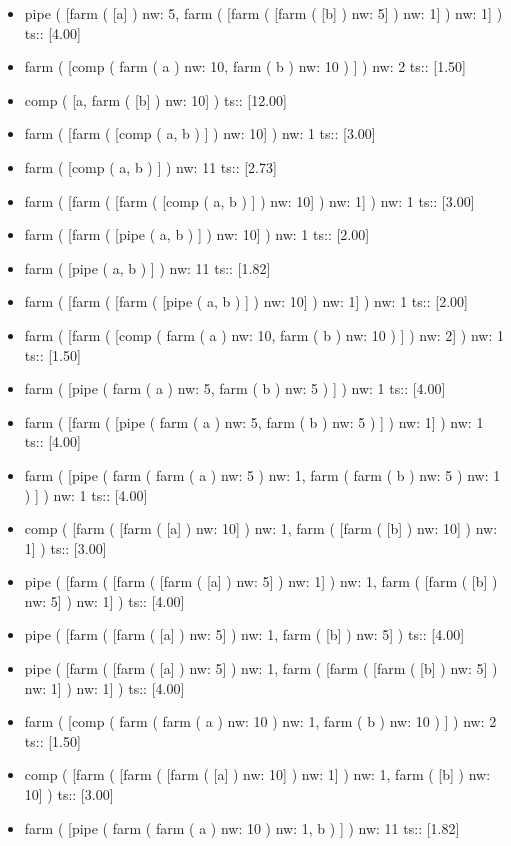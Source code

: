 \documentclass[12pt]{report}
\begin{document}
{\begin{itemize}
\item pipe  ( [farm  ( [a] )  nw: 5, farm  ( [farm  ( [farm  ( [b] )  nw: 5] )  nw: 1] )  nw: 1] )  ts::  [4.00] 
\item farm  ( [comp ( farm  ( a )  nw: 10, farm  ( b )  nw: 10 ) ] )  nw: 2 ts::  [1.50] 
\item comp  ( [a, farm  ( [b] )  nw: 10] )  ts::  [12.00] 
\item farm  ( [farm  ( [comp ( a, b ) ] )  nw: 10] )  nw: 1 ts::  [3.00] 
\item farm  ( [comp ( a, b ) ] )  nw: 11 ts::  [2.73] 
\item farm  ( [farm  ( [farm  ( [comp ( a, b ) ] )  nw: 10] )  nw: 1] )  nw: 1 ts::  [3.00] 
\item farm  ( [farm  ( [pipe ( a, b ) ] )  nw: 10] )  nw: 1 ts::  [2.00] 
\item farm  ( [pipe ( a, b ) ] )  nw: 11 ts::  [1.82] 
\item farm  ( [farm  ( [farm  ( [pipe ( a, b ) ] )  nw: 10] )  nw: 1] )  nw: 1 ts::  [2.00] 
\item farm  ( [farm  ( [comp ( farm  ( a )  nw: 10, farm  ( b )  nw: 10 ) ] )  nw: 2] )  nw: 1 ts::  [1.50] 
\item farm  ( [pipe ( farm  ( a )  nw: 5, farm  ( b )  nw: 5 ) ] )  nw: 1 ts::  [4.00] 
\item farm  ( [farm  ( [pipe ( farm  ( a )  nw: 5, farm  ( b )  nw: 5 ) ] )  nw: 1] )  nw: 1 ts::  [4.00] 
\item farm  ( [pipe ( farm  ( farm  ( a )  nw: 5 )  nw: 1, farm  ( farm  ( b )  nw: 5 )  nw: 1 ) ] )  nw: 1 ts::  [4.00] 
\item comp  ( [farm  ( [farm  ( [a] )  nw: 10] )  nw: 1, farm  ( [farm  ( [b] )  nw: 10] )  nw: 1] )  ts::  [3.00] 
\item pipe  ( [farm  ( [farm  ( [farm  ( [a] )  nw: 5] )  nw: 1] )  nw: 1, farm  ( [farm  ( [b] )  nw: 5] )  nw: 1] )  ts::  [4.00] 
\item pipe  ( [farm  ( [farm  ( [a] )  nw: 5] )  nw: 1, farm  ( [b] )  nw: 5] )  ts::  [4.00] 
\item pipe  ( [farm  ( [farm  ( [a] )  nw: 5] )  nw: 1, farm  ( [farm  ( [farm  ( [b] )  nw: 5] )  nw: 1] )  nw: 1] )  ts::  [4.00] 
\item farm  ( [comp ( farm  ( farm  ( a )  nw: 10 )  nw: 1, farm  ( b )  nw: 10 ) ] )  nw: 2 ts::  [1.50] 
\item comp  ( [farm  ( [farm  ( [farm  ( [a] )  nw: 10] )  nw: 1] )  nw: 1, farm  ( [b] )  nw: 10] )  ts::  [3.00] 
\item farm  ( [pipe ( farm  ( farm  ( a )  nw: 10 )  nw: 1, b ) ] )  nw: 11 ts::  [1.82] 

\end{itemize}}
\end{document}
